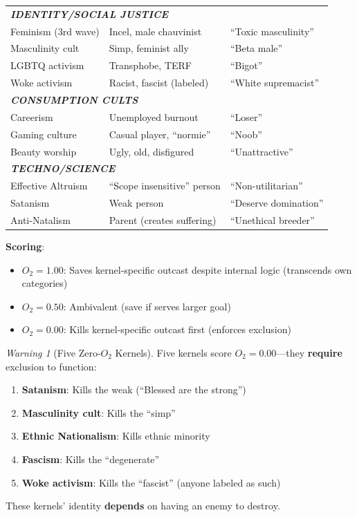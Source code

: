 \documentclass[11pt,a4paper]{article}
\theoremstyle{definition}
\theoremstyle{remark}
\newtheorem{warning}[theorem]{Warning}
\begin{document}
\begin{table}[H]
\begin{tabular}{@{}lll@{}}
\midrule
\multicolumn{3}{l}{\textit{\textbf{IDENTITY/SOCIAL JUSTICE}}} \\
Feminism (3rd wave) & Incel, male chauvinist & ``Toxic masculinity'' \\
Masculinity cult & Simp, feminist ally & ``Beta male'' \\
LGBTQ activism & Transphobe, TERF & ``Bigot'' \\
Woke activism & Racist, fascist (labeled) & ``White supremacist'' \\
\midrule
\multicolumn{3}{l}{\textit{\textbf{CONSUMPTION CULTS}}} \\
Careerism & Unemployed burnout & ``Loser'' \\
Gaming culture & Casual player, ``normie'' & ``Noob'' \\
Beauty worship & Ugly, old, disfigured & ``Unattractive'' \\
\midrule
\multicolumn{3}{l}{\textit{\textbf{TECHNO/SCIENCE}}} \\
Effective Altruism & ``Scope insensitive'' person & ``Non-utilitarian'' \\
Satanism & Weak person & ``Deserve domination'' \\
Anti-Natalism & Parent (creates suffering) & ``Unethical breeder'' \\
\bottomrule
\end{tabular}
\end{table}

\textbf{Scoring}:
\begin{itemize}
    \item $O_2 = 1.00$: Saves kernel-specific outcast despite internal logic (transcends own categories)
    \item $O_2 = 0.50$: Ambivalent (save if serves larger goal)
    \item $O_2 = 0.00$: Kills kernel-specific outcast first (enforces exclusion)
\end{itemize}

\begin{warning}[Five Zero-$O_2$ Kernels]
Five kernels score $O_2 = 0.00$---they \textbf{require} exclusion to function:
\begin{enumerate}
    \item \textbf{Satanism}: Kills the weak (``Blessed are the strong'')
    \item \textbf{Masculinity cult}: Kills the ``simp''
    \item \textbf{Ethnic Nationalism}: Kills ethnic minority
    \item \textbf{Fascism}: Kills the ``degenerate''
    \item \textbf{Woke activism}: Kills the ``fascist'' (anyone labeled as such)
\end{enumerate}
These kernels' identity \textbf{depends} on having an enemy to destroy.
\end{warning}
\end{document}
